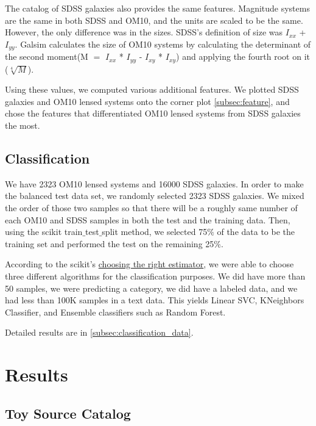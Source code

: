 \documentclass[\docopts]{\docclass}
\begin{document}
The catalog of SDSS galaxies also provides the same features. Magnitude systems are the same in both SDSS and OM10, and the units are scaled to be the same. However, the only difference was in the sizes. SDSS's definition of size was $I_{xx}$ + $I_{yy}$. Galsim calculates the size of OM10 systems by calculating the determinant of the second moment(M $=$ $I_{xx}$ * $I_{yy}$ - $I_{xy}$ * $I_{xy}$) and applying the fourth root on it ($\sqrt[4]{M}$). 

Using these values, we computed various additional features. We plotted SDSS galaxies and OM10 lensed systems onto the corner plot \ref{subsec:feature}, and chose the features that differentiated OM10 lensed systems from SDSS galaxies the most.

\subsection{Classification}
\label{subsec:classification}

We have 2323 OM10 lensed systems and 16000 SDSS galaxies. In order to make the balanced test data set, we randomly selected 2323 SDSS galaxies. We mixed the order of those two samples so that there will be a roughly same number of each OM10 and SDSS samples in both the test and the training data. Then, using the scikit train$\_$test$\_$split method, we selected 75$\%$ of the data to be the training set and performed the test on the remaining 25$\%$.

According to the scikit's \href{http://scikit-learn.org/stable/tutorial/machine_learning_map/index.html} {choosing the right estimator}, we were able to choose three different algorithms for the classification purposes. We did have more than 50 samples, we were predicting a category, we did have a labeled data, and we had less than 100K samples in a text data. This yields Linear SVC, KNeighbors Classifier, and Ensemble classifiers such as Random Forest.

Detailed results are in \ref{subsec:classification_data}.


\section{Results}
\label{sec:results}

\subsection{Toy Source Catalog}
\label{subsec:toysource}
\end{document}
